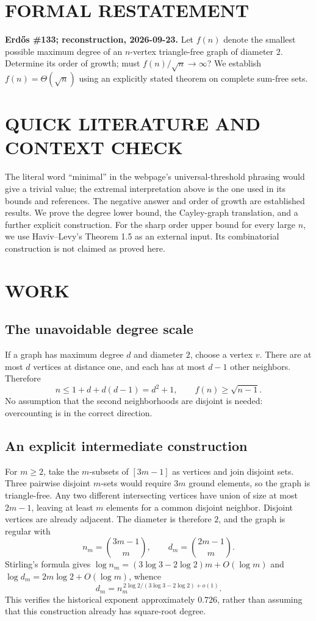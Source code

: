 \section{FORMAL RESTATEMENT}
\textbf{Erd\H{o}s \#133; reconstruction, 2026-09-23.}
Let $f(n)$ denote the smallest possible maximum degree of an $n$-vertex
triangle-free graph of diameter $2$. Determine its order of growth;
must $f(n)/\sqrt n\to\infty$? We establish $f(n)=\Theta(\sqrt n)$
using an explicitly stated theorem on complete sum-free sets.

\section{QUICK LITERATURE AND CONTEXT CHECK}
The literal word ``minimal'' in the webpage's universal-threshold
phrasing would give a trivial value; the extremal interpretation above
is the one used in its bounds and references. The negative answer and
order of growth are established results. We prove the degree lower
bound, the Cayley-graph translation, and a further explicit construction.
For the sharp order upper bound for every large $n$, we use Haviv--Levy's
Theorem 1.5 as an external input. Its combinatorial construction is not
claimed as proved here.

\section{WORK}
\subsection*{The unavoidable degree scale}
If a graph has maximum degree $d$ and diameter $2$, choose a vertex $v$.
There are at most $d$ vertices at distance one, and each has at most
$d-1$ other neighbors. Therefore
\[
 n\le1+d+d(d-1)=d^2+1,\qquad f(n)\ge\sqrt{n-1}.           \tag{1}
\]
No assumption that the second neighborhoods are disjoint is needed:
overcounting is in the correct direction.

\subsection*{An explicit intermediate construction}
For $m\ge2$, take the $m$-subsets of $[3m-1]$ as vertices and join
disjoint sets. Three pairwise disjoint $m$-sets would require $3m$
ground elements, so the graph is triangle-free. Any two different
intersecting vertices have union of size at most $2m-1$, leaving at
least $m$ elements for a common disjoint neighbor. Disjoint vertices
are already adjacent. The diameter is therefore $2$, and the graph is
regular with
\[
 n_m=\binom{3m-1}{m},\qquad d_m=\binom{2m-1}{m}.
\]
Stirling's formula gives
$\log n_m=(3\log3-2\log2)m+O(\log m)$ and
$\log d_m=2m\log2+O(\log m)$, whence
\[
 d_m=n_m^{\,2\log2/(3\log3-2\log2)+o(1)}.
\]
This verifies the historical exponent approximately $0.726$, rather
than assuming that this construction already has square-root degree.


